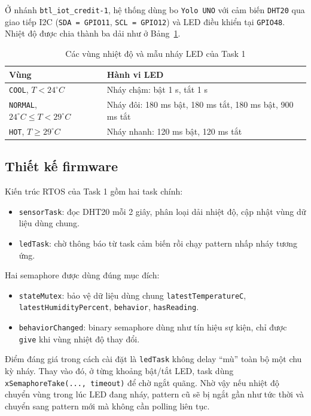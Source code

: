 \documentclass[12pt,a4paper]{article}
\begin{document}
Ở nhánh \texttt{btl\_iot\_credit-1}, hệ thống dùng bo \texttt{Yolo UNO} với cảm biến \texttt{DHT20} qua giao tiếp I2C (\texttt{SDA = GPIO11}, \texttt{SCL = GPIO12}) và LED điều khiển tại \texttt{GPIO48}. Nhiệt độ được chia thành ba dải như ở Bảng~\ref{tab:task1-band}.

\begin{table}[H]
\centering
\caption{Các vùng nhiệt độ và mẫu nháy LED của Task 1}
\label{tab:task1-band}
\begin{tabular}{>{\raggedright\arraybackslash}p{} >{\raggedright\arraybackslash}p{}}
\toprule
\textbf{Vùng} & \textbf{Hành vi LED} \\
\midrule
\texttt{COOL}, $T < 24^\circ C$ & Nháy chậm: bật 1 s, tắt 1 s \\
\texttt{NORMAL}, $24^\circ C \leq T < 29^\circ C$ & Nháy đôi: 180 ms bật, 180 ms tắt, 180 ms bật, 900 ms tắt \\
\texttt{HOT}, $T \geq 29^\circ C$ & Nháy nhanh: 120 ms bật, 120 ms tắt \\
\bottomrule
\end{tabular}
\end{table}

\subsection{Thiết kế firmware}

Kiến trúc RTOS của Task 1 gồm hai task chính:
\begin{itemize}
  \item \texttt{sensorTask}: đọc DHT20 mỗi 2 giây, phân loại dải nhiệt độ, cập nhật vùng dữ liệu dùng chung.
  \item \texttt{ledTask}: chờ thông báo từ task cảm biến rồi chạy pattern nhấp nháy tương ứng.
\end{itemize}

Hai semaphore được dùng đúng mục đích:
\begin{itemize}
  \item \texttt{stateMutex}: bảo vệ dữ liệu dùng chung \texttt{latestTemperatureC}, \texttt{latestHumidityPercent}, \texttt{behavior}, \texttt{hasReading}.
  \item \texttt{behaviorChanged}: binary semaphore dùng như tín hiệu sự kiện, chỉ được \texttt{give} khi vùng nhiệt độ thay đổi.
\end{itemize}

Điểm đáng giá trong cách cài đặt là \texttt{ledTask} không delay ``mù'' toàn bộ một chu kỳ nháy. Thay vào đó, ở từng khoảng bật/tắt LED, task dùng \texttt{xSemaphoreTake(..., timeout)} để chờ ngắt quãng. Nhờ vậy nếu nhiệt độ chuyển vùng trong lúc LED đang nháy, pattern cũ sẽ bị ngắt gần như tức thời và chuyển sang pattern mới mà không cần polling liên tục.
\end{document}
